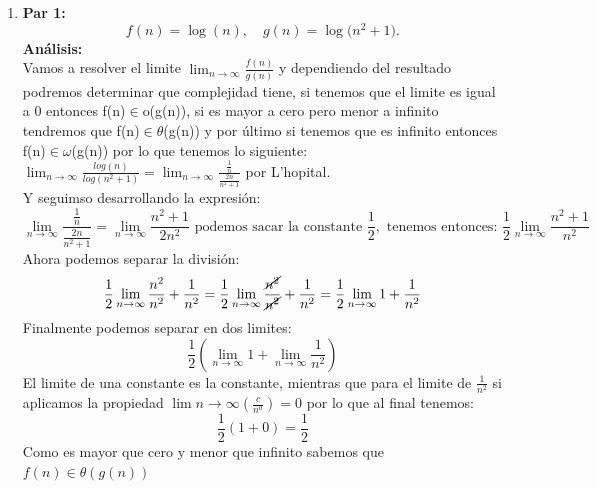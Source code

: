 \documentclass[12pt]{article}
\begin{document}
\begin{enumerate}

  \item \textbf{Par 1:} 
  \[
    f(n) = \log(n), \quad g(n) = \log\bigl(n^2 + 1\bigr).
  \]
  \textbf{Análisis:} \\
  Vamos a resolver el limite $\lim_{n \to \infty} \frac{f(n)}{g(n)}$ y dependiendo del resultado podremos determinar que complejidad tiene, si tenemos que el limite es igual a 0 entonces f(n)$\in$o(g(n)), si es mayor a cero pero menor a infinito tendremos que f(n)$\in \theta$(g(n)) y por último si tenemos que es infinito entonces f(n)$\in \omega$(g(n))
  por lo que tenemos lo siguiente: \\
  $\lim_{n \to \infty} \frac{log(n)}{log(n^2+1)} = \lim_{n \to \infty} \frac{\frac{1}{n}}{\frac{2n}{n^2+1}}$ por L'hopital. \\ Y seguimso desarrollando la expresión:
  \[\lim_{n \to \infty} \frac{\frac{1}{n}}{\frac{2n}{n^2+1}} = \lim_{n \to \infty} \frac{n^2+1}{2n^2} \text{ podemos sacar la constante } \frac{1}{2}, \text{ tenemos entonces: } \frac{1}{2}\lim_{n \to \infty} \frac{n^2+1}{n^2}
  \]
  Ahora podemos separar la división: 
  \[\frac{1}{2}\lim_{n \to \infty} \frac{n^2}{n^2}+\frac{1}{n^2} = \frac{1}{2}\lim_{n \to \infty} \frac{\cancel{n^2}}{\cancel{n^2}}+\frac{1}{n^2} = \frac{1}{2}\lim_{n \to \infty} 1+ \frac{1}{n^2}
  \]
  Finalmente podemos separar en dos limites:
  \[
  \frac{1}{2}(\lim_{n \to \infty} 1 +\lim_{n \to \infty} \frac{1}{n^2})
  \]
  El limite de una constante es la constante, mientras que para el limite de $\frac{1}{n^2}$ si aplicamos la propiedad $\lim {n \to \infty} (\frac{c}{n^a}) =0$ por lo que al final tenemos:
  \[
  \frac{1}{2}(1+0) = \frac{1}{2}
  \]
  Como es mayor que cero y menor que infinito sabemos que $f(n)\in \theta (g(n))$


\end{enumerate}
\end{document}
